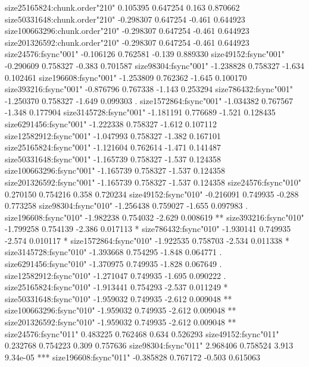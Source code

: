 \documentclass[11pt]{article}
\begin{document}
\begin{Schunk}
\begin{Soutput}
size25165824:chunk.order"210"   0.105395   0.647254   0.163 0.870662    
size50331648:chunk.order"210"  -0.298307   0.647254  -0.461 0.644923    
size100663296:chunk.order"210" -0.298307   0.647254  -0.461 0.644923    
size201326592:chunk.order"210" -0.298307   0.647254  -0.461 0.644923    
size24576:fsync"001"           -0.106126   0.762581  -0.139 0.889330    
size49152:fsync"001"           -0.290609   0.758327  -0.383 0.701587    
size98304:fsync"001"           -1.238828   0.758327  -1.634 0.102461    
size196608:fsync"001"          -1.253809   0.762362  -1.645 0.100170    
size393216:fsync"001"          -0.876796   0.767338  -1.143 0.253294    
size786432:fsync"001"          -1.250370   0.758327  -1.649 0.099303 .  
size1572864:fsync"001"         -1.034382   0.767567  -1.348 0.177904    
size3145728:fsync"001"         -1.181191   0.776689  -1.521 0.128435    
size6291456:fsync"001"         -1.222338   0.758327  -1.612 0.107112    
size12582912:fsync"001"        -1.047993   0.758327  -1.382 0.167101    
size25165824:fsync"001"        -1.121604   0.762614  -1.471 0.141487    
size50331648:fsync"001"        -1.165739   0.758327  -1.537 0.124358    
size100663296:fsync"001"       -1.165739   0.758327  -1.537 0.124358    
size201326592:fsync"001"       -1.165739   0.758327  -1.537 0.124358    
size24576:fsync"010"            0.270150   0.754216   0.358 0.720234    
size49152:fsync"010"           -0.216091   0.749935  -0.288 0.773258    
size98304:fsync"010"           -1.256438   0.759027  -1.655 0.097983 .  
size196608:fsync"010"          -1.982238   0.754032  -2.629 0.008619 ** 
size393216:fsync"010"          -1.799258   0.754139  -2.386 0.017113 *  
size786432:fsync"010"          -1.930141   0.749935  -2.574 0.010117 *  
size1572864:fsync"010"         -1.922535   0.758703  -2.534 0.011338 *  
size3145728:fsync"010"         -1.393668   0.754295  -1.848 0.064771 .  
size6291456:fsync"010"         -1.370975   0.749935  -1.828 0.067649 .  
size12582912:fsync"010"        -1.271047   0.749935  -1.695 0.090222 .  
size25165824:fsync"010"        -1.913441   0.754293  -2.537 0.011249 *  
size50331648:fsync"010"        -1.959032   0.749935  -2.612 0.009048 ** 
size100663296:fsync"010"       -1.959032   0.749935  -2.612 0.009048 ** 
size201326592:fsync"010"       -1.959032   0.749935  -2.612 0.009048 ** 
size24576:fsync"011"            0.483225   0.762468   0.634 0.526293    
size49152:fsync"011"            0.232768   0.754223   0.309 0.757636    
size98304:fsync"011"            2.968406   0.758524   3.913 9.34e-05 ***
size196608:fsync"011"          -0.385828   0.767172  -0.503 0.615063    

\end{Soutput}
\end{Schunk}
\end{document}
